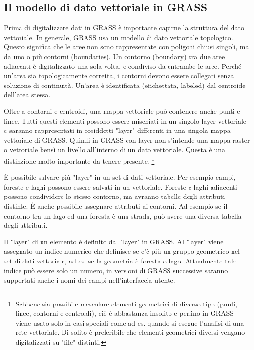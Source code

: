 \subsection{Il modello di dato vettoriale in GRASS}\label{label_vectmodel}

Prima di digitalizzare dati in GRASS è importante capirne la struttura del
dato vettoriale. In generale, GRASS usa un modello di
dato vettoriale topologico. Questo significa che le aree
non sono rappresentate con poligoni chiusi singoli, ma da uno o più contorni
(boundaries). Un  contorno (boundary) tra due aree adiacenti è digitalizzato una
sola volta, e condiviso da entrambe le aree. Perché un'area sia
topologicamente corretta, i contorni devono essere collegati senza soluzione di
continuità. Un'area è identificata (etichettata, labeled) dal centroide
dell'area stessa.

Oltre a contorni e centroidi, una mappa vettoriale può contenere anche punti e
linee. Tutti questi elementi possono essere mischiati in un singolo layer
vettoriale e saranno rappresentati in cosiddetti "layer" differenti in una
singola mappa vettoriale di GRASS. Quindi in GRASS con layer non s'intende
una mappa raster o vettoriale bensì un livello all'interno di un dato vettoriale.
Questa è una distinzione molto importante da tenere presente.
\footnote{Sebbene sia possibile mescolare elementi geometrici di diverso tipo
(punti, linee, contorni e centroidi), ciò è abbastanza insolito e perfino in
GRASS viene usato solo in casi speciali come ad es. quando si esegue l'analisi
di una rete vettoriale. Di solito è preferibile che elementi geometrici
diversi vengano digitalizzati su "file" distinti.}

È possibile salvare più "layer" in un set di dati vettoriale. Per esempio
campi, foreste e laghi possono essere salvati in un vettoriale. Foreste e
laghi adiacenti possono condividere lo stesso contorno, ma avranno tabelle degli
attributi distinte. È anche possibile assegnare attributi ai contorni. Ad
esempio se il contorno tra un lago ed una foresta è una strada, può avere una
diversa tabella degli attributi.
 
Il "layer" di un elemento è definito dal "layer" in GRASS. Al "layer" viene
assegnato un indice numerico che definisce se c'è più un gruppo geometrico nel set di dati
vettoriale, ad es. se la geometria è foresta o lago. Attualmente tale indice può essere
solo un numero, in versioni di GRASS successive saranno supportati anche i
nomi dei campi nell'interfaccia utente.

